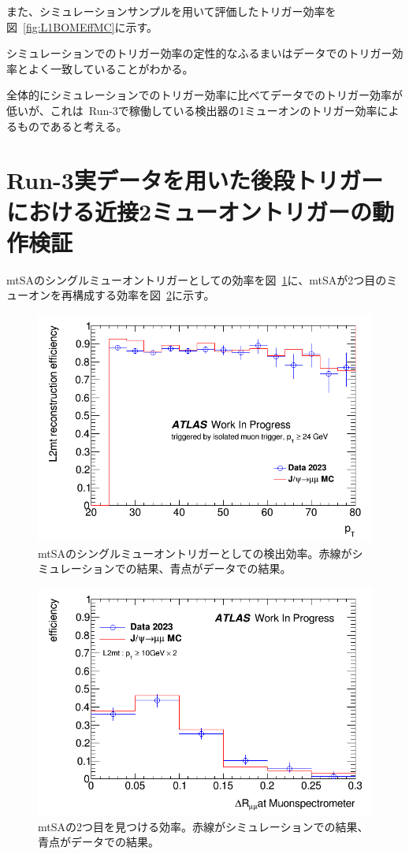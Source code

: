 また、シミュレーションサンプルを用いて評価したトリガー効率を図~\ref{fig:L1BOMEffMC}に示す。

シミュレーションでのトリガー効率の定性的なふるまいはデータでのトリガー効率とよく一致していることがわかる。

全体的にシミュレーションでのトリガー効率に比べてデータでのトリガー効率が低いが、これは~Run-3で稼働している検出器の1ミューオンのトリガー効率によるものであると考える。

\section{Run-3実データを用いた後段トリガーにおける近接2ミューオントリガーの動作検証}\label{chapter4-4}

mtSAのシングルミューオントリガーとしての効率を図~\ref{fig:L2mtSingleEff}に、mtSAが2つ目のミューオンを再構成する効率を図~\ref{fig:L2mt2muonEff}に示す。

\begin{figure}[H]
    \centering
    \includegraphics[clip, width=12cm]{fig/4/L2mt_singlemuon_eff.png}
    \caption{mtSAのシングルミューオントリガーとしての検出効率。赤線がシミュレーションでの結果、青点がデータでの結果。}
    \label{fig:L2mtSingleEff}
\end{figure}

\begin{figure}[H]
    \centering
    \includegraphics[clip, width=12cm]{fig/4/L2mt_eff_ext_deltaR.png}
    \caption{mtSAの2つ目を見つける効率。赤線がシミュレーションでの結果、青点がデータでの結果。}
    \label{fig:L2mt2muonEff}
\end{figure}

